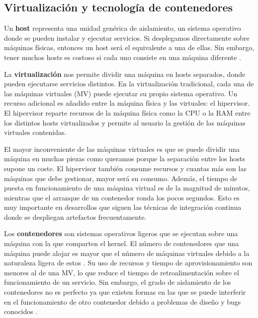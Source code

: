 \documentclass[11pt,spanish,listoffigures]{tfgetsinf}
\begin{document}
\subsection{Virtualización y tecnología de contenedores}

Un \textbf{host} representa una unidad genérica de aislamiento, un sistema operativo donde se pueden instalar y ejecutar servicios. Si desplegamos directamente sobre máquinas físicas, entonces un host será el equivalente a una de ellas. Sin embargo, tener muchos hosts es costoso si cada uno consiste en una máquina diferente \cite{Newman2015a}.

La \textbf{virtualización} nos permite dividir una máquina en hosts separados, donde pueden ejecutarse servicios distintos. En la virtualización tradicional, cada una de las máquinas virtuales (MV) puede ejecutar su propio sistema operativo. Un recurso adicional es añadido entre la máquina física y las virtuales: el hipervisor. El hipervisor reparte recursos de la máquina física como la CPU o la RAM entre los distintos hosts virtualizados y permite al usuario la gestión de las máquinas virtuales contenidas.

El mayor inconveniente de las máquinas virtuales es que se puede dividir una máquina en muchas piezas como queramos porque la separación entre los hosts supone un coste. El hipervisor también consume recursos y cuantas más son las máquinas que debe gestionar, mayor será su consumo. Además, el tiempo de puesta en funcionamiento de una máquina virtual es de la magnitud de minutos, mientras que el arranque de un contenedor ronda los pocos segundos. \cite{Dua2014} Esto es muy importante en desarrollos que siguen las técnicas de integración continua donde se despliegan artefactos frecuentamente. 

Los \textbf{contenedores} son sistemas operativos ligeros que se ejecutan sobre una máquina con la que comparten el kernel. El número de contenedores que una máquina puede alojar es mayor que el número de máquinas virtuales debido a la naturaleza ligera de estos \cite{Dua2014}. Su uso de recursos y tiempo de aprovisionamiento son menores al de una MV, lo que reduce el tiempo de retroalimentación sobre el funcionamiento de un servicio. Sin embargo, el grado de aislamiento de los contenedores no es perfecto ya que existen formas en las que se puede interferir en el funcionamiento de otro contenedor debido a problemas de diseño y bugs conocidos \cite{Newman2015a}.
\end{document}
